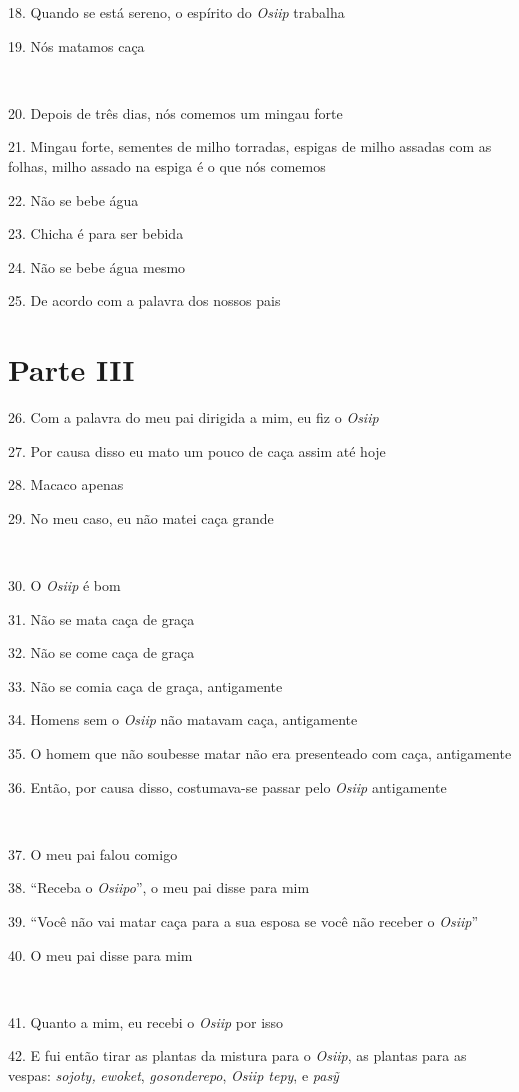 18. Quando se está sereno, o espírito do \emph{Osiip} trabalha

19. Nós matamos caça

~

20. Depois de três dias, nós comemos um mingau forte

21. Mingau forte, sementes de milho torradas, espigas de milho assadas
com as folhas, milho assado na espiga é o que nós comemos

22. Não se bebe água

23. Chicha é para ser bebida

24. Não se bebe água mesmo

25. De acordo com a palavra dos nossos pais

\section{Parte III}

26. Com a palavra do meu pai dirigida a mim, eu fiz o \emph{Osiip}

27. Por causa disso eu mato um pouco de caça assim até hoje

28. Macaco apenas

29. No meu caso, eu não matei caça grande

~

30. O \emph{Osiip} é bom

31. Não se mata caça de graça

32. Não se come caça de graça

33. Não se comia caça de graça, antigamente

34. Homens sem o \emph{Osiip} não matavam caça, antigamente

35. O homem que não soubesse matar não era presenteado com caça,
antigamente

36. Então, por causa disso, costumava-se passar pelo \emph{Osiip}
antigamente

~

37. O meu pai falou comigo

38. ``Receba o \emph{Osiipo}'', o meu pai disse para mim

39. ``Você não vai matar caça para a sua esposa se você não receber o
\emph{Osiip}''

40. O meu pai disse para mim

~

41. Quanto a mim, eu recebi o \emph{Osiip} por isso

42. E fui então tirar as plantas da mistura para o \emph{Osiip}, as
plantas para as vespas: \emph{sojoty,} \emph{ewoket},
\emph{gosonderepo}, \emph{Osiip tepy}, e \emph{pasỹ}

